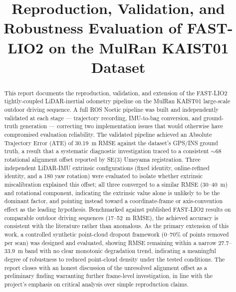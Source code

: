 \documentclass[conference]{IEEEtran}
\begin{document}
\title{Reproduction, Validation, and Robustness Evaluation of FAST-LIO2 on the MulRan KAIST01 Dataset}

\author{
}

\maketitle

\begin{abstract}
This report documents the reproduction, validation, and extension of the FAST-LIO2 tightly-coupled LiDAR-inertial odometry pipeline \cite{fastlio2} on the MulRan KAIST01 large-scale outdoor driving sequence. A full ROS Noetic pipeline was built and independently validated at each stage --- trajectory recording, IMU-to-bag conversion, and ground-truth generation --- correcting two implementation issues that would otherwise have compromised evaluation reliability. The validated pipeline achieved an Absolute Trajectory Error (ATE) of 30.19~m RMSE against the dataset's GPS/INS ground truth, a result that a systematic diagnostic investigation traced to a consistent $\sim$68\textdegree{} rotational alignment offset reported by SE(3) Umeyama registration. Three independent LiDAR-IMU extrinsic configurations (fixed identity, online-refined identity, and a 180\textdegree{} yaw rotation) were evaluated to isolate whether extrinsic miscalibration explained this offset; all three converged to a similar RMSE (30--40~m) and rotational component, indicating the extrinsic value alone is unlikely to be the dominant factor, and pointing instead toward a coordinate-frame or axis-convention effect as the leading hypothesis. Benchmarked against published FAST-LIO2 results on comparable outdoor driving sequences (17--52~m RMSE), the achieved accuracy is consistent with the literature rather than anomalous. As the primary extension of this work, a controlled synthetic point-cloud dropout framework (0--70\% of points removed per scan) was designed and evaluated, showing RMSE remaining within a narrow 27.7--33.9~m band with no clear monotonic degradation trend, indicating a meaningful degree of robustness to reduced point-cloud density under the tested conditions. The report closes with an honest discussion of the unresolved alignment offset as a preliminary finding warranting further frame-level investigation, in line with the project's emphasis on critical analysis over simple reproduction claims.
\end{abstract}
\end{document}
